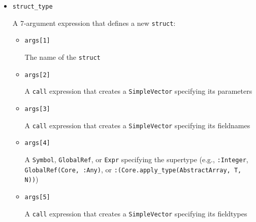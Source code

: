\begin{itemize}
\begin{itemize}
A function name, or \texttt{false} if unknown. If a symbol, then the expression first behaves like the 1-argument form above. This argument is ignored from then on. When this is \texttt{false}, it means a method is being added strictly by type, \texttt{(::T)(x) = x}.


\item \texttt{args[2]}

A \texttt{SimpleVector} of argument type data. \texttt{args[2][1]} is a \texttt{SimpleVector} of the argument types, and \texttt{args[2][2]} is a \texttt{SimpleVector} of type variables corresponding to the method{\textquotesingle}s static parameters.


\item \texttt{args[3]}

A \texttt{CodeInfo} of the method itself. For {\textquotedbl}out of scope{\textquotedbl} method definitions (adding a method to a function that also has methods defined in different scopes) this is an expression that evaluates to a \texttt{:lambda} expression.

\end{itemize}

\item \texttt{struct\_type}

A 7-argument expression that defines a new \texttt{struct}:

\begin{itemize}
\item \texttt{args[1]}

The name of the \texttt{struct}


\item \texttt{args[2]}

A \texttt{call} expression that creates a \texttt{SimpleVector} specifying its parameters


\item \texttt{args[3]}

A \texttt{call} expression that creates a \texttt{SimpleVector} specifying its fieldnames


\item \texttt{args[4]}

A \texttt{Symbol}, \texttt{GlobalRef}, or \texttt{Expr} specifying the supertype (e.g., \texttt{:Integer}, \texttt{GlobalRef(Core, :Any)}, or \texttt{:(Core.apply\_type(AbstractArray, T, N))})


\item \texttt{args[5]}

A \texttt{call} expression that creates a \texttt{SimpleVector} specifying its fieldtypes



\end{itemize}
\end{itemize}
